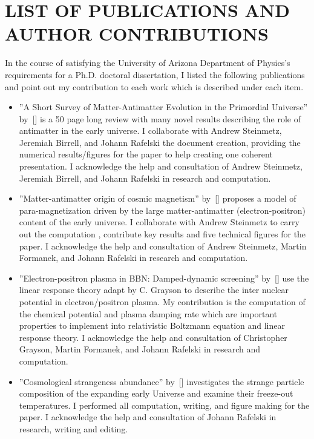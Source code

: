\chapter*{LIST OF PUBLICATIONS AND AUTHOR CONTRIBUTIONS}
In the course of satisfying the University of Arizona Department of Physics's requirements for a 
Ph.D. doctoral dissertation, I listed the following publications and point out my contribution to each work which is described under each item.
\begin{itemize}
 \item ''A Short Survey of Matter-Antimatter Evolution in the Primordial 
Universe'' by~[\cite{Rafelski:2023emw}] is a 50 page long review with many novel results 
describing the role of antimatter in the early universe. I collaborate with 
Andrew Steinmetz, Jeremiah Birrell, and Johann Rafelski the document creation, providing the numerical results/figures for the paper to help creating one coherent presentation. I acknowledge the help and consultation of Andrew Steinmetz, Jeremiah Birrell, and Johann Rafelski in research and computation. 

\item ''Matter-antimatter origin of cosmic magnetism'' 
by~[\cite{Steinmetz:2023nsc}] proposes a model of para-magnetization driven by the large 
matter-antimatter (electron-positron) content of the early universe. I collaborate with Andrew Steinmetz to carry out the computation
, contribute key results and five 
technical figures for the paper. I acknowledge the help and consultation of Andrew Steinmetz, Martin Formanek, and Johann Rafelski in research and computation. 

\item ''Electron-positron plasma in BBN: Damped-dynamic screening'' by~[\cite{Grayson:2023flr}] use the linear response theory adapt by C. Grayson to describe the inter nuclear potential in electron/positron plasma. My contribution is the computation of the chemical potential and plasma damping rate which are important properties to  implement into relativistic Boltzmann equation and linear response theory. I acknowledge the help and consultation of Christopher Grayson, Martin Formanek, and Johann Rafelski in research and computation.

\item ''Cosmological strangeness abundance'' by~[\cite{Yang:2021bko}] investigates the strange particle composition of the expanding early Universe and examine their freeze-out temperatures. I performed all computation, writing, and 
figure making for the paper. I acknowledge the help and consultation of Johann Rafelski in 
research, writing and editing.


\end{itemize}
